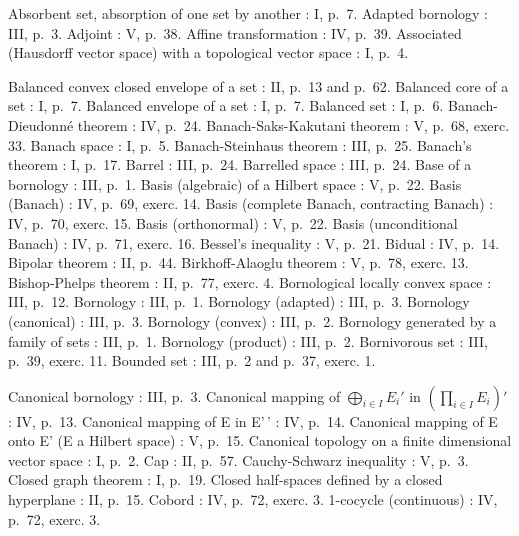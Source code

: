 
Absorbent set, absorption of one set by another : I, p.~7. Adapted bornology : III, p.~3. Adjoint : V, p.~38. Affine transformation : IV, p.~39. Associated (Hausdorff vector space) with a topological vector space : I, p.~4.

Balanced convex closed envelope of a set : II, p.~13 and p.~62. Balanced core of a set : I, p.~7. Balanced envelope of a set : I, p.~7. Balanced set : I, p.~6. Banach-Dieudonné theorem : IV, p.~24. Banach-Saks-Kakutani theorem : V, p.~68, exerc. 33. Banach space : I, p.~5. Banach-Steinhaus theorem : III, p.~25. Banach's theorem : I, p.~17. Barrel : III, p.~24. Barrelled space : III, p.~24. Base of a bornology : III, p.~1. Basis (algebraic) of a Hilbert space : V, p.~22. Basis (Banach) : IV, p.~69, exerc. 14. Basis (complete Banach, contracting Banach) : IV, p.~70, exerc. 15. Basis (orthonormal) : V, p.~22. Basis (unconditional Banach) : IV, p.~71, exerc. 16. Bessel's inequality : V, p.~21. Bidual : IV, p.~14. Bipolar theorem : II, p.~44. Birkhoff-Alaoglu theorem : V, p.~78, exerc. 13. Bishop-Phelps theorem : II, p.~77, exerc. 4. Bornological locally convex space : III, p.~12. Bornology : III, p.~1. Bornology (adapted) : III, p.~3. Bornology (canonical) : III, p.~3. Bornology (convex) : III, p.~2. Bornology generated by a family of sets : III, p.~1. Bornology (product) : III, p.~2. Bornivorous set : III, p.~39, exerc. 11. Bounded set : III, p.~2 and p.~37, exerc. 1.

Canonical bornology : III, p.~3. Canonical mapping of \(\bigoplus_{i\in I}E_i'\) in \(\left(\prod_{i\in I}E_i\right)'\) : IV, p.~13. Canonical mapping of E in E'\,' : IV, p.~14. Canonical mapping of E onto E' (E a Hilbert space) : V, p.~15. Canonical topology on a finite dimensional vector space : I, p.~2. Cap : II, p.~57. Cauchy-Schwarz inequality : V, p.~3. Closed graph theorem : I, p.~19. Closed half-spaces defined by a closed hyperplane : II, p.~15. Cobord : IV, p.~72, exerc. 3. 1-cocycle (continuous) : IV, p.~72, exerc. 3.


